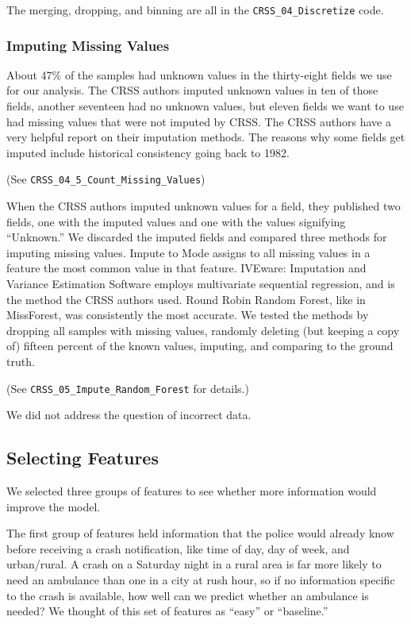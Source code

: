 The merging, dropping, and binning are all in the \verb|CRSS_04_Discretize| code.

\subsubsection{Imputing Missing Values}

About 47\% of the samples had unknown values in the thirty-eight fields we use for our analysis.   The CRSS authors imputed unknown values in ten of those fields, another seventeen had no unknown values, but eleven fields we want to use had missing values that were not imputed by CRSS.   The CRSS authors have a very helpful report on their imputation methods.  \citep{CRSS_Imputation}  The reasons why some fields get imputed include historical consistency going back to 1982.  

(See \verb|CRSS_04_5_Count_Missing_Values|)  

When the CRSS authors imputed unknown values for a field, they published two fields, one with the imputed values and one with the values signifying ``Unknown.''  We discarded the imputed fields and compared three methods for imputing missing values.  Impute to Mode assigns to all missing values in a feature the most common value in that feature.  IVEware: Imputation and Variance Estimation Software employs multivariate sequential regression, and is the method the CRSS authors used.  Round Robin Random Forest, like in MissForest, was consistently the most accurate.  We tested the methods by dropping all samples with missing values, randomly deleting (but keeping a copy of) fifteen percent of the known values, imputing, and comparing to the ground truth.  

(See \verb|CRSS_05_Impute_Random_Forest| for details.)

We did not address the question of incorrect data.  

\subsection{Selecting Features}

We selected three groups of features to see whether more information would improve the model.  

The first group of features held information that the police would already know before receiving a crash notification, like time of day, day of week, and urban/rural.  A crash on a Saturday night in a rural area is far more likely to need an ambulance than one in a city at rush hour, so if no information specific to the crash is available, how well can we predict whether an ambulance is needed?  We thought of this set of features as ``easy'' or ``baseline.''

